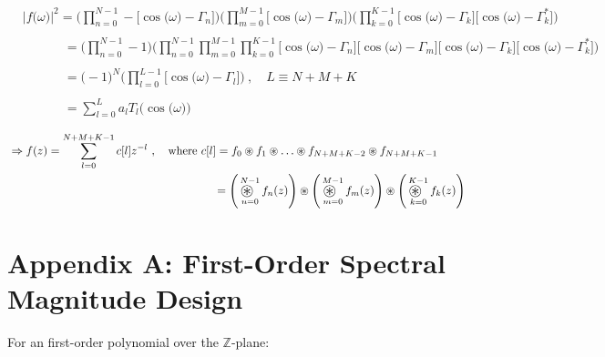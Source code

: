 \documentclass{article}
\newcommand{\Conv}{ \mathop{ \scalebox{1.5}{\raisebox{-0.2ex}{$\circledast$} } } }
\begin{document}
\begin{align*}
    & \Big|f\big(\omega\big)\Big|^{2} = \Bigg(\prod_{n = 0}^{N - 1}-\Big[\cos\big(\omega\big) - \Gamma_{n}\Big]\Bigg)\Bigg(\prod_{m = 0}^{M - 1}\Big[\cos\big(\omega\big) - \Gamma_{m}\Big]\Bigg)\Bigg(\prod_{k = 0}^{K - 1} \Big[\cos\big(\omega\big) - \Gamma_{k}\Big]\Big[\cos\big(\omega\big) - \Gamma_{k}^{*}\Big]\Bigg) \\ \\
    & \quad \quad \quad \ = \Bigg(\prod_{n = 0}^{N - 1} -1\Bigg)\Bigg(\prod_{n = 0}^{N - 1}\prod_{m = 0}^{M - 1}\prod_{k = 0}^{K - 1}\Big[\cos\big(\omega\big) - \Gamma_{n}\Big]\Big[\cos\big(\omega\big) - \Gamma_{m}\Big]\Big[\cos\big(\omega\big) - \Gamma_{k}\Big]\Big[\cos\big(\omega\big) - \Gamma_{k}^{*}\Big]\Bigg) \\ \\
    & \quad \quad \quad \ = \Big(-1\Big)^{N}\Bigg(\prod_{l = 0}^{L - 1}\Big[\cos\big(\omega\big) - \Gamma_{l}\Big]\Bigg) \ , \quad L \equiv N + M + K \\ \\
    & \quad \quad \quad \ = \sum_{l = 0}^{L} a_{l}T_{l}\Big(\cos\big(\omega\big)\Big)
  \end{align*}

\newpage

\begin{align*}
    & \Rightarrow f(z) = \sum_{l = 0}^{N + M + K - 1}c[l]z^{-l} \ , \quad \text{where} \ c[l] = f_{0} \circledast f_{1} \circledast \ldots \circledast f_{N + M + K - 2} \circledast f_{N + M + K - 1} \\
    & \quad \quad \quad \quad \quad \quad \quad \quad \quad \quad \quad \quad \quad \quad \quad \quad \quad \quad = \Bigg(\Conv_{n = 0}^{N - 1}f_{n}(z)\Bigg) \circledast \Bigg(\Conv_{m = 0}^{M - 1}f_{m}(z)\Bigg) \circledast \Bigg(\Conv_{k = 0}^{K - 1}f_{k}(z)\Bigg)
  \end{align*}

\newpage
\section*{Appendix A: First-Order Spectral Magnitude Design}

For an first-order polynomial over the $\mathbb{Z}$-plane:
\end{document}
